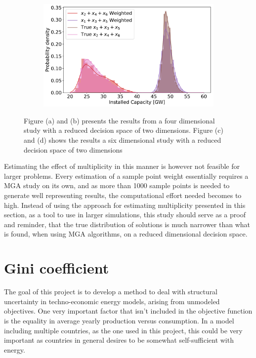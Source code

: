 \begin{figure}[h]
\begin{subfigure}{.5\textwidth}
		\caption{}
		\label{fig:multi_6D_1}
	\end{subfigure}%
	\begin{subfigure}{.5\textwidth}
		\centering
		\includegraphics[width=1.\textwidth]{./Images/multi_6D_2}
		\caption{}
		\label{fig:multi_6D_2}
	\end{subfigure}
	\caption{Figure (a) and (b) presents the results from a four dimensional study with a reduced decision space of two dimensions. Figure (c) and (d) shows the results a six dimensional study with a reduced decision space of two dimensions}
	\label{fig:multi_46D}
\end{figure}

Estimating the effect of multiplicity in this manner is however not feasible for larger problems. Every estimation of a sample point weight essentially requires a MGA study on its own, and as more than 1000 sample points is needed to generate well representing results, the computational effort needed becomes to high. Instead of using the approach for estimating multiplicity presented in this section, as a tool to use in larger simulations, this study should serve as a proof and reminder, that the true distribution of solutions is much narrower than what is found, when using MGA algorithms, on a reduced dimensional decision space. 


\section{Gini coefficient}

The goal of this project is to develop a method to deal with structural uncertainty in techno-economic energy models, arising from unmodeled objectives. One very important factor that isn't included in the objective function is the equality in average yearly production versus consumption. In a model including multiple countries, as the one used in this project, this could be very important as countries in general desires to be somewhat self-sufficient with energy. 

